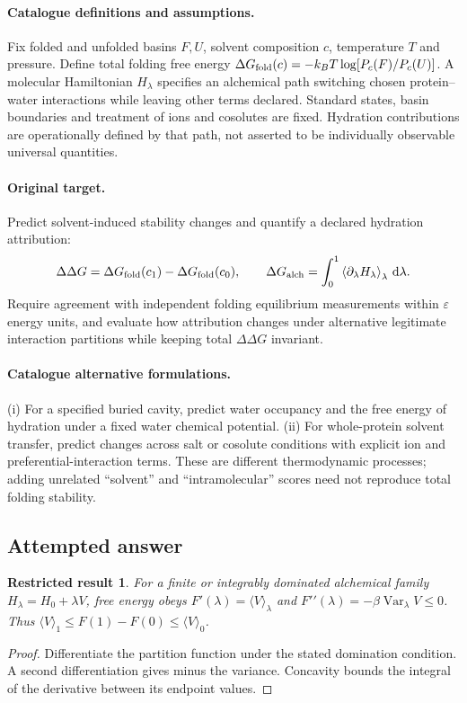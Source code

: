 \documentclass[11pt]{article}
\DeclareMathOperator{\Var}{Var}
\newcommand{\dd}{\,\mathrm d}
\providecommand{\Var}{\operatorname{Var}}
\newtheorem{attemptresult}{Restricted result}[section]
\begin{document}
\paragraph{Catalogue definitions and assumptions.}
Fix folded and unfolded basins $F,U$, solvent composition $c$, temperature $T$ and pressure. Define total folding free energy $\Delta G_{\rm fold}(c)=-k_BT\log[P_c(F)/P_c(U)]$. A molecular Hamiltonian $H_\lambda$ specifies an alchemical path switching chosen protein--water interactions while leaving other terms declared. Standard states, basin boundaries and treatment of ions and cosolutes are fixed. Hydration contributions are operationally defined by that path, not asserted to be individually observable universal quantities.
\paragraph{Original target.}
Predict solvent-induced stability changes and quantify a declared hydration attribution:
\[\Delta\Delta G=\Delta G_{\rm fold}(c_1)-\Delta G_{\rm fold}(c_0),\qquad \Delta G_{\rm alch}=\int_0^1\left\langle\partial_\lambda H_\lambda\right\rangle_\lambda\dd\lambda.\]
Require agreement with independent folding equilibrium measurements within $\varepsilon$ energy units, and evaluate how attribution changes under alternative legitimate interaction partitions while keeping total $\Delta\Delta G$ invariant.
\paragraph{Catalogue alternative formulations.}
(i) For a specified buried cavity, predict water occupancy and the free energy of hydration under a fixed water chemical potential. (ii) For whole-protein solvent transfer, predict changes across salt or cosolute conditions with explicit ion and preferential-interaction terms. These are different thermodynamic processes; adding unrelated ``solvent'' and ``intramolecular'' scores need not reproduce total folding stability.
\subsection{Attempted answer}
\begin{attemptresult}
For a finite or integrably dominated alchemical family $H_\lambda=H_0+\lambda V$, free energy obeys $F\prime(\lambda)=\langle V\rangle_\lambda$ and $F\prime\prime(\lambda)=-\beta\Var_\lambda V\leq0$. Thus $\langle V\rangle_1\leq F(1)-F(0)\leq\langle V\rangle_0$.
\end{attemptresult}
\begin{proof}
Differentiate the partition function under the stated domination condition. A second differentiation gives minus the variance. Concavity bounds the integral of the derivative between its endpoint values.
\end{proof}
\end{document}
